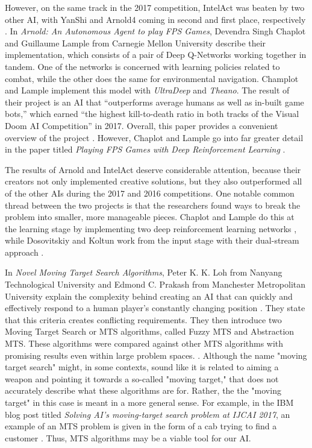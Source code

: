 However, on the same track in the 2017 competition, IntelAct was beaten by two other AI, with YanShi and Arnold4 coming in second and first place, respectively \cite{VDComp:2017}. In {\it Arnold: An Autonomous Agent to play FPS Games}, Devendra Singh Chaplot and Guillaume Lample from Carnegie Mellon University describe their implementation, which consists of a pair of Deep Q-Networks working together in tandem. One of the networks is concerned with learning policies related to combat, while the other does the same for environmental navigation. Champlot and Lample implement this model with {\it UltraDeep} and {\it Theano}. The result of their project is an AI that ``outperforms average humans as well as in-built game bots,'' which earned ``the highest kill-to-death ratio in both tracks of the Visual Doom AI Competition'' in 2017. Overall, this paper provides a convenient overview of the project \cite{Chaplot}. However, Chaplot and Lample go into far greater detail in the paper titled {\it Playing FPS Games with Deep Reinforcement Learning} \cite{Chaplot:2016}.

The results of Arnold and IntelAct deserve considerable attention, because their creators not only implemented creative solutions, but they also outperformed all of the other AIs during the 2017 and 2016 competitions. One notable common thread between the two projects is that the researchers found ways to break the problem into smaller, more manageable pieces. Chaplot and Lample do this at the learning stage by implementing two deep reinforcement learning networks \cite{Chaplot}, while Dosovitskiy and Koltun work from the input stage with their dual-stream approach \cite{Dosovitskiy:2016}.

In {\it Novel Moving Target Search Algorithms}, Peter K. K. Loh from Nanyang Technological University and Edmond C. Prakash from Manchester Metropolitan University explain the complexity behind creating an AI that can quickly and effectively respond to a human player's constantly changing position \cite{Loh:2009}. They state that this criteria creates conflicting requirements. They then introduce two Moving Target Search or MTS algorithms, called Fuzzy MTS and Abstraction MTS. These algorithms were compared against other MTS algorithms with promising results even within large problem spaces. \cite{Loh:2009}. Although the name "moving target search" might, in some contexts, sound like it is related to aiming a weapon and pointing it towards a so-called "moving target," that does not accurately describe what these algorithms are for. Rather, the the "moving target" in this case is meant in a more general sense. For example, in the IBM blog post titled {\it Solving AI’s moving-target search problem at IJCAI 2017}, an example of an MTS problem is given in the form of a cab trying to find a customer \cite{IBM:2017}. Thus, MTS algorithms may be a viable tool for our AI.

